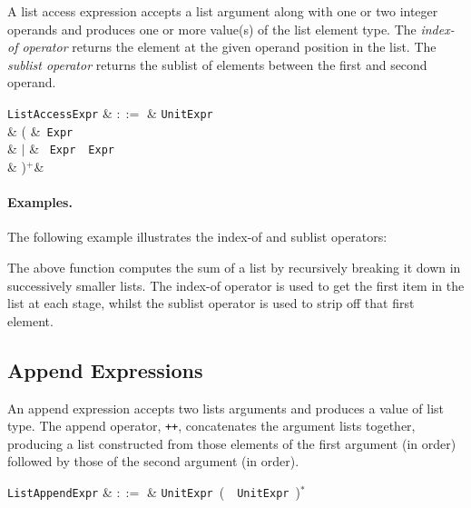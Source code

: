 A list access expression accepts a list argument along with one or two integer operands and produces one or more value(s) of the list element type.  The {\em index-of operator} returns the element at the given operand position in the list.  The {\em sublist operator} returns the sublist of elements between the first and second operand.

\begin{syntax}
  \verb+ListAccessExpr+ & $::=$ & \verb+UnitExpr+\\
   &  \big( &\token{[}\ \verb+Expr+\ \token{]}\\
   & $|$ & \token{[}\ \verb+Expr+\ \ \verb+Expr+\ \token{]}\\
   & \big)$^+$&\\
\end{syntax}

\paragraph{Examples.} The following example illustrates the index-of and sublist operators:



The above function computes the sum of a list by recursively breaking it down in successively smaller lists.  The index-of operator is used to get the first item in the list at each stage, whilst the sublist operator is used to strip off that first element. 


\subsection{Append Expressions}
\label{c_expr_append}

An append expression accepts two lists arguments and produces a value of list type.  The append operator, \lstinline{++}, concatenates the argument lists together, producing a list constructed from those elements of the first argument (in order) followed by those of the second argument (in order).

\begin{syntax}
  \verb+ListAppendExpr+ & $::=$ & \verb+UnitExpr+\ \big(\ \token{++}\
  \verb+UnitExpr+\ \big)$^*$\\
\end{syntax}

